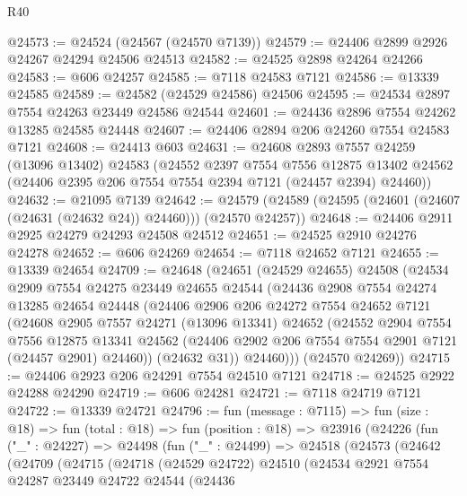\begin{lexlean}{R40}
\begin{coremodule}
@24573 := @24524 (@24567 (@24570 @7139))
@24579 := @24406 @2899 @2926 @24267 @24294 @24506 @24513
@24582 := @24525 @2898 @24264 @24266
@24583 := @606 @24257
@24585 := @7118 @24583 @7121
@24586 := @13339 @24585
@24589 := @24582 (@24529 @24586) @24506
@24595 := @24534 @2897 @7554 @24263 @23449 @24586 @24544
@24601 := @24436 @2896 @7554 @24262 @13285 @24585 @24448
@24607 := @24406 @2894 @206 @24260 @7554 @24583 @7121
@24608 := @24413 @603
@24631 := @24608
    @2893
    @7557
    @24259
    (@13096 @13402)
    @24583
    (@24552
      @2397
      @7554
      @7556
      @12875
      @13402
      @24562
      (@24406 @2395 @206 @7554 @7554 @2394 @7121 (@24457 @2394) @24460))
@24632 := @21095 @7139
@24642 := @24579 (@24589 (@24595 (@24601 (@24607 (@24631 (@24632 @24)) @24460))) (@24570 @24257))
@24648 := @24406 @2911 @2925 @24279 @24293 @24508 @24512
@24651 := @24525 @2910 @24276 @24278
@24652 := @606 @24269
@24654 := @7118 @24652 @7121
@24655 := @13339 @24654
@24709 := @24648
    (@24651
      (@24529 @24655)
      @24508
      (@24534
        @2909
        @7554
        @24275
        @23449
        @24655
        @24544
        (@24436
          @2908
          @7554
          @24274
          @13285
          @24654
          @24448
          (@24406
            @2906
            @206
            @24272
            @7554
            @24652
            @7121
            (@24608
              @2905
              @7557
              @24271
              (@13096 @13341)
              @24652
              (@24552
                @2904
                @7554
                @7556
                @12875
                @13341
                @24562
                (@24406 @2902 @206 @7554 @7554 @2901 @7121 (@24457 @2901) @24460))
              (@24632 @31))
            @24460)))
      (@24570 @24269))
@24715 := @24406 @2923 @206 @24291 @7554 @24510 @7121
@24718 := @24525 @2922 @24288 @24290
@24719 := @606 @24281
@24721 := @7118 @24719 @7121
@24722 := @13339 @24721
@24796 := fun (message : @7115) =>
  fun (size : @18) =>
  fun (total : @18) =>
  fun (position : @18) =>
  @23916
    (@24226
      (fun ("_" : @24227) =>
      @24498
        (fun ("_" : @24499) =>
        @24518
          (@24573
            (@24642
              (@24709
                (@24715
                  (@24718
                    (@24529 @24722)
                    @24510
                    (@24534
                      @2921
                      @7554
                      @24287
                      @23449
                      @24722
                      @24544
                      (@24436

\end{coremodule}
\end{lexlean}
